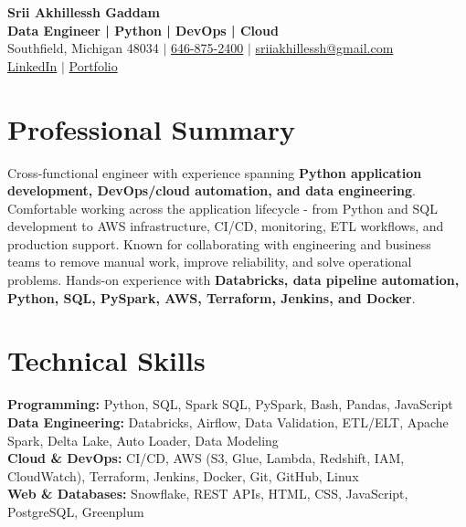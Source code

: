 \documentclass[letterpaper,10pt]{article}
\begin{document}
\fontsize{9.35pt}{10.45pt}\selectfont

\begin{center}
    {\LARGE \textbf{Srii Akhillessh Gaddam}} \\[-1pt]
    \textbf{Data Engineer | Python | DevOps | Cloud} \\[2pt]
    Southfield, Michigan 48034 $|$
    \href{tel:6468752400}{646-875-2400} $|$
    \href{mailto:sriiakhillessh@gmail.com}{sriiakhillessh@gmail.com} \\[1pt]
    \href{https://www.linkedin.com/in/srii-akhiilessh-gaddam-b48668191/}{LinkedIn} $|$
    \href{https://sriiakhillesshg.github.io/portfolio/}{Portfolio}
\end{center}
\vspace{-8pt}

\section{Professional Summary}
\small{Cross-functional engineer with experience spanning \textbf{Python application development, DevOps/cloud automation, and data engineering}. Comfortable working across the application lifecycle - from Python and SQL development to AWS infrastructure, CI/CD, monitoring, ETL workflows, and production support. Known for collaborating with engineering and business teams to remove manual work, improve reliability, and solve operational problems. Hands-on experience with \textbf{Databricks, data pipeline automation, Python, SQL, PySpark, AWS, Terraform, Jenkins, and Docker}.}

\section{Technical Skills}
\small{
\textbf{Programming:} Python, SQL, Spark SQL, PySpark, Bash, Pandas, JavaScript \\
\textbf{Data Engineering:} Databricks, Airflow, Data Validation, ETL/ELT, Apache Spark, Delta Lake, Auto Loader, Data Modeling \\
\textbf{Cloud \& DevOps:} CI/CD, AWS (S3, Glue, Lambda, Redshift, IAM, CloudWatch), Terraform, Jenkins, Docker, Git, GitHub, Linux \\
\textbf{Web \& Databases:} Snowflake, REST APIs, HTML, CSS, JavaScript, PostgreSQL, Greenplum
}

\end{document}
